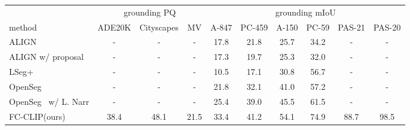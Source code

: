 \documentclass{article}
\newcommand{\modelname}{FC-CLIP\xspace}
\newcommand{\tablestyle}[2]{\setlength{\tabcolsep}{#1}\renewcommand{\arraystretch}{#2}\centering\footnotesize}
\begin{document}
\begin{table*}[!t]
\tablestyle{1pt}{1.05}
\caption{
    \label{tab:grounding}
    \textbf{Grounding segmentation performance.}
    The proposed \modelname also demonstrates state-of-the-art performances on grounding segmentation. MV: Mapillary Vistas
}
\begin{tabular}{l|ccc|cccccc}
                                    &  \multicolumn{3}{c}{grounding PQ}      & \multicolumn{6}{c}{grounding mIoU}                                                                      \\
method                            & ADE20K & Cityscapes & MV    & A-847         & PC-459        & A-150         & PC-59         & PAS-21    & PAS-20       \\
\shline
ALIGN~\cite{jia2021scaling,ghiasi2022scaling}      & - & - & -          & 17.8           & 21.8           & 25.7          & 34.2          & -      & -            \\
ALIGN w/ proposal~\cite{jia2021scaling,ghiasi2022scaling}      & - & - & -          & 17.3           & 19.7           & 25.3          & 32.0          & -       & -           \\
LSeg+~\cite{li2022language,ghiasi2022scaling}      & - & - & -           & 10.5           & 17.1           & 30.8          & 56.7          & -     & -             \\
OpenSeg~\cite{ghiasi2022scaling}      & - & - & -           & 21.8           & 32.1           & 41.0          & 57.2          & -       & -           \\
OpenSeg~\cite{ghiasi2022scaling} w/ L. Narr      & - & - & -           & 25.4           & 39.0           & 45.5          & 61.5         & -       & -           \\

\hline \hline

\modelname (ours)        &  38.4 & 48.1 & 21.5    & 33.4 & 41.2 & 54.1 & 74.9 & 88.7 & 98.5    \\
\end{tabular}


\end{table*}
\end{document}
